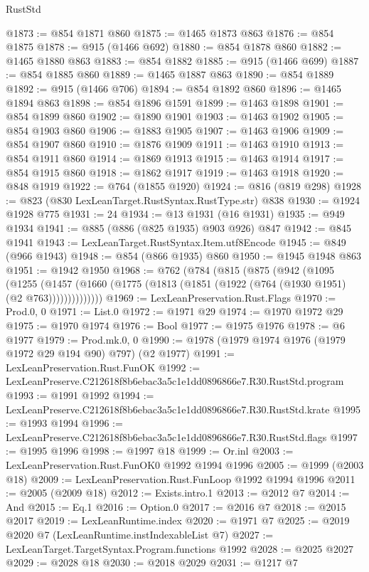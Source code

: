\begin{lexlean}{RustStd}
\begin{coremodule}
@1873 := @854 @1871 @860
@1875 := @1465 @1873 @863
@1876 := @854 @1875
@1878 := @915 (@1466 @692)
@1880 := @854 @1878 @860
@1882 := @1465 @1880 @863
@1883 := @854 @1882
@1885 := @915 (@1466 @699)
@1887 := @854 @1885 @860
@1889 := @1465 @1887 @863
@1890 := @854 @1889
@1892 := @915 (@1466 @706)
@1894 := @854 @1892 @860
@1896 := @1465 @1894 @863
@1898 := @854 @1896 @1591
@1899 := @1463 @1898
@1901 := @854 @1899 @860
@1902 := @1890 @1901
@1903 := @1463 @1902
@1905 := @854 @1903 @860
@1906 := @1883 @1905
@1907 := @1463 @1906
@1909 := @854 @1907 @860
@1910 := @1876 @1909
@1911 := @1463 @1910
@1913 := @854 @1911 @860
@1914 := @1869 @1913
@1915 := @1463 @1914
@1917 := @854 @1915 @860
@1918 := @1862 @1917
@1919 := @1463 @1918
@1920 := @848 @1919
@1922 := @764 (@1855 @1920)
@1924 := @816 (@819 @298)
@1928 := @823 (@830 LexLeanTarget.RustSyntax.RustType.str) @838
@1930 := @1924 @1928 @775
@1931 := 24
@1934 := @13 @1931 (@16 @1931)
@1935 := @949 @1934
@1941 := @885 (@886 (@825 @1935) @903 @926) @847
@1942 := @845 @1941
@1943 := LexLeanTarget.RustSyntax.Item.utf8Encode
@1945 := @849 (@966 @1943)
@1948 := @854 (@866 @1935) @860
@1950 := @1945 @1948 @863
@1951 := @1942 @1950
@1968 := @762
    (@784
      (@815
        (@875
          (@942
            (@1095
              (@1255
                (@1457 (@1660 (@1775 (@1813 (@1851 (@1922 (@764 (@1930 @1951) (@2 @763))))))))))))))
@1969 := LexLeanPreservation.Rust.Flags
@1970 := Prod.{0, 0}
@1971 := List.{0}
@1972 := @1971 @29
@1974 := @1970 @1972 @29
@1975 := @1970 @1974
@1976 := Bool
@1977 := @1975 @1976
@1978 := @6 @1977
@1979 := Prod.mk.{0, 0}
@1990 := @1978 (@1979 @1974 @1976 (@1979 @1972 @29 @194 @90) @797) (@2 @1977)
@1991 := LexLeanPreservation.Rust.FunOK
@1992 := LexLeanPreserve.C212618f8b6ebac3a5c1e1dd0896866e7.R30.RustStd.program
@1993 := @1991 @1992
@1994 := LexLeanPreserve.C212618f8b6ebac3a5c1e1dd0896866e7.R30.RustStd.krate
@1995 := @1993 @1994
@1996 := LexLeanPreserve.C212618f8b6ebac3a5c1e1dd0896866e7.R30.RustStd.flags
@1997 := @1995 @1996
@1998 := @1997 @18
@1999 := Or.inl
@2003 := LexLeanPreservation.Rust.FunOK0 @1992 @1994 @1996
@2005 := @1999 (@2003 @18)
@2009 := LexLeanPreservation.Rust.FunLoop @1992 @1994 @1996
@2011 := @2005 (@2009 @18)
@2012 := Exists.intro.{1}
@2013 := @2012 @7
@2014 := And
@2015 := Eq.{1}
@2016 := Option.{0}
@2017 := @2016 @7
@2018 := @2015 @2017
@2019 := LexLeanRuntime.index
@2020 := @1971 @7
@2025 := @2019 @2020 @7 (LexLeanRuntime.instIndexableList @7)
@2027 := LexLeanTarget.TargetSyntax.Program.functions @1992
@2028 := @2025 @2027
@2029 := @2028 @18
@2030 := @2018 @2029
@2031 := @1217 @7

\end{coremodule}
\end{lexlean}
